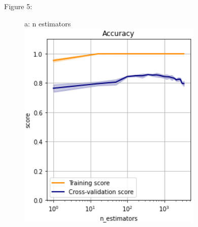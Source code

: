 \documentclass{article}
\begin{document}
\begin{figure}
	\centering
	Figure 5:\\
	\begin{subfigure}{.19\textwidth}
		\centering
		a: n estimators\\
		\includegraphics[width=\linewidth]{poland_xgb_n_estimators_accuracy.png}
		

\end{subfigure}
\end{figure}
\end{document}

